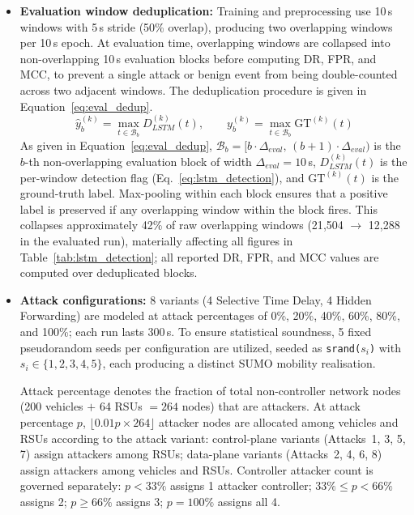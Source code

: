 \documentclass[12pt, a4paper]{report}
\begin{document}
{{\begin{itemize}
    \item \textbf{Evaluation window deduplication:}
Training and preprocessing use 10\,s windows with
5\,s stride (50\% overlap), producing two overlapping
windows per 10\,s epoch. At evaluation time, overlapping
windows are collapsed into non-overlapping 10\,s
evaluation blocks before computing \ac{DR}, \ac{FPR},
and \ac{MCC}, to prevent a single attack or benign
event from being double-counted across two adjacent
windows. The deduplication procedure is given in
Equation~\eqref{eq:eval_dedup}.
\begin{equation}
\hat{y}_b^{(k)} =
\max_{t \in \mathcal{B}_b} D_{LSTM}^{(k)}(t),
\qquad
y_b^{(k)} =
\max_{t \in \mathcal{B}_b} \text{GT}^{(k)}(t)
\label{eq:eval_dedup}
\end{equation}
As given in Equation~\eqref{eq:eval_dedup},
$\mathcal{B}_b = [b\cdot\Delta_{eval},\,
(b{+}1)\cdot\Delta_{eval})$ is the $b$-th
non-overlapping evaluation block of width
$\Delta_{eval} = 10$\,s, $D_{LSTM}^{(k)}(t)$
is the per-window detection flag
(Eq.~\ref{eq:lstm_detection}), and
$\text{GT}^{(k)}(t)$ is the ground-truth label.
Max-pooling within each block ensures that a
positive label is preserved if any overlapping
window within the block fires. This collapses
approximately 42\% of raw overlapping windows
(21{,}504 $\to$ 12{,}288 in the evaluated run),
materially affecting all figures in
Table~\ref{tab:lstm_detection}; all reported
\ac{DR}, \ac{FPR}, and \ac{MCC} values are
computed over deduplicated blocks.

    \item \textbf{Attack configurations:} 8 variants (4 Selective Time Delay, 4 Hidden Forwarding) are modeled at attack percentages of 0\%, 20\%, 40\%, 60\%, 80\%, and 100\%; each run lasts 300\,s. To ensure statistical soundness, 5 fixed pseudorandom seeds per configuration are utilized, seeded as \texttt{srand($s_i$)} with $s_i \in \{1,2,3,4,5\}$, each producing a distinct SUMO mobility realisation.

    Attack percentage denotes the fraction of total
non-controller network nodes (200 vehicles $+$
64 RSUs $= 264$ nodes) that are attackers.
At attack percentage $p$,
$\lfloor 0.01p \times 264 \rfloor$ attacker nodes
are allocated among vehicles and RSUs according
to the attack variant: control-plane variants
(Attacks~1, 3, 5, 7) assign attackers among RSUs;
data-plane variants (Attacks~2, 4, 6, 8) assign
attackers among vehicles and RSUs.
Controller attacker count is governed separately:
$p < 33\%$ assigns 1 attacker controller;
$33\% \leq p < 66\%$ assigns 2;
$p \geq 66\%$ assigns 3; $p = 100\%$ assigns all 4.


\end{itemize}}}
\end{document}
